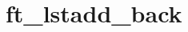 \chapter{ft\+\_\+lstadd\+\_\+back}
\hypertarget{md_Documentation_2ft__lstadd__back}{}\label{md_Documentation_2ft__lstadd__back}

